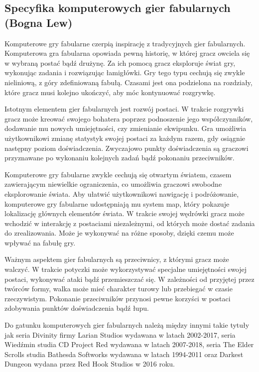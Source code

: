 \subsection{Specyfika komputerowych gier fabularnych (Bogna Lew)}\label{ss:rpg}
Komputerowe gry fabularne czerpią inspirację z tradycyjnych gier fabularnych. Komputerowa
gra fabularna opowiada pewną historię, w której gracz owciela się w wybraną postać bądź drużynę.
Za ich pomocą gracz eksploruje świat gry, wykonując zadania i rozwiązując łamigłówki. Gry tego typu cechują się zwykle
nieliniową, z góry zdefiniowaną fabułą. Czasami jest ona podzielona na rozdziały, które gracz musi kolejno ukończyć, aby
móc kontynuować rozgrywkę.

Istotnym elementem gier fabularnych jest rozwój postaci. W trakcie rozgrywki gracz może kreować swojego bohatera
poprzez podnoszenie jego współczynników, dodawanie mu nowych umiejętności, czy zmienianie ekwipunku. Gra umożliwia
użytkownikowi zmianę statystyk swojej postaci za każdym razem, gdy osiągnie następny poziom doświadczenia. Zwyczajowo
punkty doświadczenia są graczowi przyznawane po wykonaniu kolejnych zadań bądź pokonaniu przeciwników.

Komputerowe gry fabularne zwykle cechują się otwartym światem, czasem zawierającym niewielkie ograniczenia, co umożliwia
graczowi swobodne eksplorowanie świata. Aby ułatwić użytkownikowi nawigację i podróżowanie, komputerowe gry fabularne
udostępniają mu system map, który pokazuje lokalizację głównych elementów świata. W trakcie swojej wędrówki gracz może
wchodzić w interakcję z postaciami niezależnymi, od których może dostać zadania do zrealizowania. Może je wykonywać na
różne sposoby, dzięki czemu może wpływać na fabułę gry.

Ważnym aspektem gier fabularnych są przeciwnicy, z którymi gracz może walczyć. W trakcie potyczki może wykorzystywać
specjalne umiejętności swojej postaci, wykonywać ataki bądź przemieszczać się. W zależności od przyjętej przez twórców
formy, walka może mieć charakter turowy lub przebiegać w czasie rzeczywistym. Pokonanie przeciwników przynosi pewne
korzyści w postaci zdobywania punktów doświadczenia bądź łupu.

Do gatunku komputerowych gier fabularnych należą między innymi takie tytuły jak seria Divinity firmy Larian Studios
wydawana w latach 2002-2017, seria Wiedźmin studia CD Project Red wydawana w latach 2007-2018, seria The Elder Scrolls
studia Bathesda Softworks wydawana w latach 1994-2011 oraz Darkest Dungeon wydana przez Red Hook Studios w 2016 roku.
